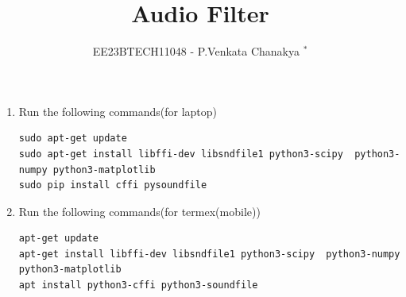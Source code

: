 \documentclass[journal,12pt,twocolumn]{IEEEtran}
\theoremstyle{remark}
\begin{document}

\vspace{3cm}
\title{Audio Filter}
\author{EE23BTECH11048 - P.Venkata Chanakya $^{*}$%
}
\maketitle
\newpage
\bigskip
\renewcommand{\thefigure}{\arabic{figure}}
\renewcommand{\thetable}{\theenumi}


\begin{enumerate}[label=\thesection.\arabic*,ref=\thesection.\theenumi]
\section{Software Installation}
\item Run the following commands(for laptop)
\begin{lstlisting}
sudo apt-get update
sudo apt-get install libffi-dev libsndfile1 python3-scipy  python3-numpy python3-matplotlib 
sudo pip install cffi pysoundfile 
\end{lstlisting}
\item Run the following commands(for termex(mobile))
\begin{lstlisting}
apt-get update
apt-get install libffi-dev libsndfile1 python3-scipy  python3-numpy python3-matplotlib 
apt install python3-cffi python3-soundfile 
\end{lstlisting}
\end{enumerate}
\end{document}
